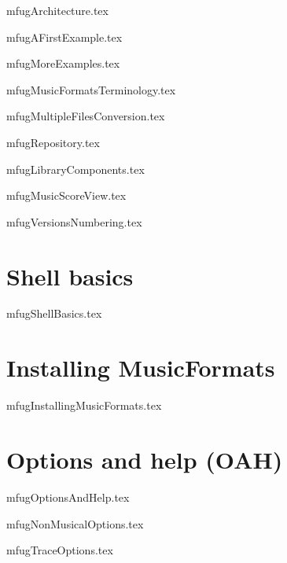 \documentclass[11pt,a4paper]{report}
\begin{document}
{mfugArchitecture.tex}

{mfugAFirstExample.tex}

{mfugMoreExamples.tex}

{mfugMusicFormatsTerminology.tex}

{mfugMultipleFilesConversion.tex}

{mfugRepository.tex}

{mfugLibraryComponents.tex}

{mfugMusicScoreView.tex}

{mfugVersionsNumbering.tex}


\part{Shell basics}

{mfugShellBasics.tex}


\part{Installing MusicFormats}

{mfugInstallingMusicFormats.tex}


\part{Options and help (OAH)}

{mfugOptionsAndHelp.tex}

{mfugNonMusicalOptions.tex}

{mfugTraceOptions.tex}

\end{document}
